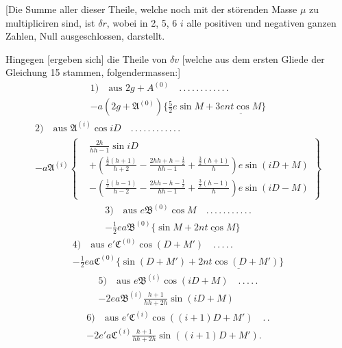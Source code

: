 [Die Summe aller dieser Theile, welche noch mit der störenden Masse \(\mu\) zu multipliciren sind, ist \(\delta r\), wobei in 2, 5, 6 \(i\) alle positiven und negativen ganzen Zahlen, Null ausgeschlossen, darstellt.

Hingegen [ergeben sich] die Theile von \(\delta v\) [welche aus dem ersten Gliede der Gleichung 15 stammen, folgendermassen:]
\[
\begin{gathered}
1)\quad\text{aus }2g+A^{(0)}\quad .\, .\, .\, .\, .\, .\, .\, .\, .\, .\, .\, .\\[.5ex]
-a(2g+\mathfrak A^{(0)})\{\tfrac52e\sin M+\underline{3ent\cos M\}}
\end{gathered}
\]
\[
\begin{gathered}
2)\quad\text{aus }\mathfrak A^{(i)}\cos iD\quad .\, .\, .\, .\, .\, .\, .\, .\, .\, .\, .\, .\\[.5ex]
-a\mathfrak A^{(i)}\left\{\begin{aligned}
&\frac{2h}{hh-1}\sin iD\\
&+\left(\frac{\tfrac12(h+1)}{h+2}-\frac{2hh+h-\tfrac12}{hh-1}+\frac{\tfrac32(h+1)}h\right)e\sin(iD+M)\\
&-\left(\frac{\tfrac12(h-1)}{h-2}-\frac{2hh-h-\tfrac12}{hh-1}+\frac{\tfrac32(h-1)}h\right)e\sin(iD-M)
\end{aligned}\right\}
\end{gathered}
\]
\[
\begin{gathered}
3)\quad\text{aus }e\mathfrak B^{(0)}\cos M\quad .\, .\, .\, .\, .\, .\, .\, .\, .\, .\, .\\[.5ex]
-\tfrac12ea\mathfrak B^{(0)}\{\sin M+\underline{2nt\cos M}\}
\end{gathered}
\]
\[
\begin{gathered}
4)\quad\text{aus }e'\mathfrak C^{(0)}\cos(D+M')\quad .\, .\, .\, .\, .\\[.5ex]
-\tfrac12ea\mathfrak C^{(0)}\{\sin(D+M')+\underline{2nt\cos(D+M')}\}
\end{gathered}
\]
\[
\begin{gathered}
5)\quad\text{aus }e\mathfrak B^{(i)}\cos(iD+M)\quad .\, .\, .\, .\, .\\[.5ex]
-2ea\mathfrak B^{(i)}\frac{h+1}{hh+2h}\sin(iD+M)
\end{gathered}
\]
\[
\begin{gathered}
6)\quad\text{aus }e'\mathfrak C^{(i)}\cos((i+1)D+M')\quad .\, .\\[.5ex]
-2e'a\mathfrak C^{(i)}\frac{h+1}{hh+2h}\sin((i+1)D+M').
\end{gathered}
\]

